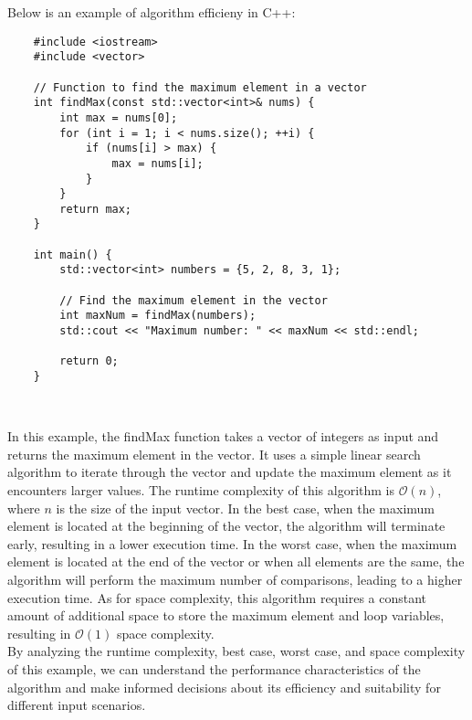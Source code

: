 \begin{solution}
    Below is an example of algorithm efficieny in C++: \\
    \horizontalline
    \begin{verbatim}
    #include <iostream>
    #include <vector>
    
    // Function to find the maximum element in a vector
    int findMax(const std::vector<int>& nums) {
        int max = nums[0];
        for (int i = 1; i < nums.size(); ++i) {
            if (nums[i] > max) {
                max = nums[i];
            }
        }
        return max;
    }
    
    int main() {
        std::vector<int> numbers = {5, 2, 8, 3, 1};
    
        // Find the maximum element in the vector
        int maxNum = findMax(numbers);
        std::cout << "Maximum number: " << maxNum << std::endl;
    
        return 0;
    }        
    \end{verbatim} \\
    \horizontalline

    \noindent In this example, the findMax function takes a vector of integers as input and returns the maximum element in the vector. It uses a simple linear search algorithm to iterate through the vector and update the maximum element as it encounters larger values. The runtime complexity of this algorithm is $\mathcal{O}(n)$, where $n$ is the size of the input vector. In the best case, when the maximum element is located at the beginning 
    of the vector, the algorithm will terminate early, resulting in a lower execution time. In the worst case, when the maximum element is located at the end of the vector or when all elements are the same, the algorithm will perform the maximum number of comparisons, leading to a higher execution time. As for space complexity, this algorithm requires a constant amount of additional space to store the maximum element and loop variables, 
    resulting in $\mathcal{O}(1)$ space complexity. \\

    \noindent By analyzing the runtime complexity, best case, worst case, and space complexity of this example, we can understand the performance characteristics of the algorithm and make informed decisions about its efficiency and suitability for different input scenarios. \\
\end{solution}